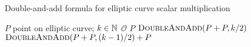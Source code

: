 \begin{algorithm}[t]
\caption{Double-and-add formula for elliptic curve
    scalar multiplication}
\label{alg:ec_double_and_add}
\begin{algorithmic}[1]
\Require $P$ point on \gls{elliptic curve}; $k\in\mathbb{N}$
        \State \Return $\mathcal{O}$
        \State \Return $P$
        \State \Return $\textsc{DoubleAndAdd}(P+P, k/2)$
    \Else
        \State \Return $\textsc{DoubleAndAdd}(P+P, (k-1)/2)+P$
    \EndIf
\EndProcedure
\end{algorithmic}
\end{algorithm}
